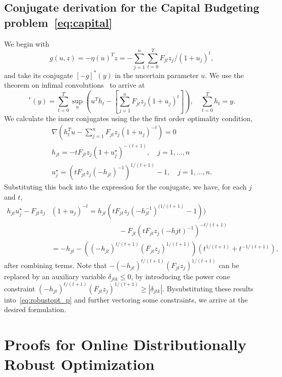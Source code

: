 \section{Conjugate derivation for the Capital Budgeting problem~\eqref{eq:capital}}
\label{app:capital}
We begin with
\begin{equation*}
g(u,z) = -\eta(u)^Tz = -\sum_{j = 1}^n \sum_{t = 0}^T F_{jt}z_j/(1+u_j)^{t},
\end{equation*}
and take its conjugate $[-g]^*(y)$ in the uncertain parameter $u$. We use the theorem on infimal convolutions~\citep[Theorem 11.23(a), p. 493]{rockafellar_wets_1998} to arrive at
\begin{equation*}
	[-g]^*(y) = \sum_{t = 0}^T \sup_{u} \left( u^Th_t -  \left[\sum_{j = 1}^n F_{jt}z_j(1+ u_j)^t\right]\right), \quad \sum_{t = 0}^T h_t = y.
	\end{equation*}
We calculate the inner conjugates using the the first order optimality condition,
\begin{align*}
\nabla \left(h_t^Tu - \sum_{j = 1}^n F_{jt}z_j(1+ u_j)^{-t}\right) = 0 \\
h_{jt} = -tF_{jt}z_j(1+u_j^\star)^{-(t+1)}, \quad j = 1,\dots,n \\
u_j^\star = (tF_{jt}z_j(-h_{jt})^{-1})^{1/(t+1)} - 1, \quad j = 1,\dots,n.
\end{align*}
Substituting this back into the expression for the conjugate, we have, for each $j$ and $t$,
\begin{align*}
	h_{jt}u_j^\star - F_{jt}z_j&(1+u_j)^{-t} = h_{jt}(tF_{jt}z_j(-h_{jt}^{-1})^{(1/(t+1)} - 1)) \\
	&\hspace{4cm} - F_{jt}(tF_{jt}z_j(-h{jt})^{-1})^{-t/(t+1)}\\
&= -h_{jt} - ((-h_{jt})^{t/(t+1)}(F_{jt}z_j)^{1/(t+1)})(t^{1/(t+1)} + t^{-1/(t+1)}),
	\end{align*}
after combining terms. Note that $-(-h_{jt})^{t/(t+1)}(F_{jt}z_j)^{1/(t+1)}$ can be replaced by an auxiliary variable $\delta_{jtk} \leq 0$, by introducing the power cone constraint $(-h_{jt})^{t/(t+1)}(F_{jt}z_j)^{1/(t+1)} \geq |\delta_{jtk} |$. Bysubstituting these results into~\eqref{eq:robustopt_p} and further vectoring some constraints, we arrive at the desired formulation.

\chapter{Proofs for Online Distributionally Robust Optimization}
\label{app:online_dro}

